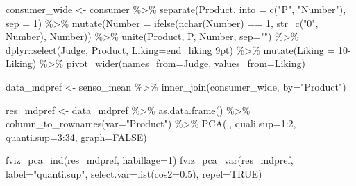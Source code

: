 \documentclass[
]{book}
\newenvironment{Shaded}{\begin{snugshade}}{\end{snugshade}}
\newcommand{\AttributeTok}[1]{\textcolor[rgb]{0.77,0.63,0.00}{#1}}
\newcommand{\ConstantTok}[1]{\textcolor[rgb]{0.00,0.00,0.00}{#1}}
\newcommand{\DecValTok}[1]{\textcolor[rgb]{0.00,0.00,0.81}{#1}}
\newcommand{\FloatTok}[1]{\textcolor[rgb]{0.00,0.00,0.81}{#1}}
\newcommand{\FunctionTok}[1]{\textcolor[rgb]{0.00,0.00,0.00}{#1}}
\newcommand{\NormalTok}[1]{#1}
\newcommand{\OtherTok}[1]{\textcolor[rgb]{0.56,0.35,0.01}{#1}}
\newcommand{\SpecialCharTok}[1]{\textcolor[rgb]{0.00,0.00,0.00}{#1}}
\newcommand{\StringTok}[1]{\textcolor[rgb]{0.31,0.60,0.02}{#1}}
\begin{document}
\begin{Shaded}
\begin{Highlighting}[]
\NormalTok{consumer\_wide }\OtherTok{\textless{}{-}}\NormalTok{ consumer }\SpecialCharTok{\%\textgreater{}\%} 
  \FunctionTok{separate}\NormalTok{(Product, }\AttributeTok{into =} \FunctionTok{c}\NormalTok{(}\StringTok{"P"}\NormalTok{, }\StringTok{"Number"}\NormalTok{), }\AttributeTok{sep =} \DecValTok{1}\NormalTok{) }\SpecialCharTok{\%\textgreater{}\%} 
  \FunctionTok{mutate}\NormalTok{(}\AttributeTok{Number =} \FunctionTok{ifelse}\NormalTok{(}\FunctionTok{nchar}\NormalTok{(Number) }\SpecialCharTok{==} \DecValTok{1}\NormalTok{, }\FunctionTok{str\_c}\NormalTok{(}\StringTok{"0"}\NormalTok{, Number), Number)) }\SpecialCharTok{\%\textgreater{}\%} 
  \FunctionTok{unite}\NormalTok{(Product, P, Number, }\AttributeTok{sep=}\StringTok{""}\NormalTok{) }\SpecialCharTok{\%\textgreater{}\%} 
\NormalTok{  dplyr}\SpecialCharTok{::}\FunctionTok{select}\NormalTok{(Judge, Product, }\AttributeTok{Liking=}\StringTok{\textasciigrave{}}\AttributeTok{end\_liking 9pt}\StringTok{\textasciigrave{}}\NormalTok{) }\SpecialCharTok{\%\textgreater{}\%} 
  \FunctionTok{mutate}\NormalTok{(}\AttributeTok{Liking =} \DecValTok{10}\SpecialCharTok{{-}}\NormalTok{Liking) }\SpecialCharTok{\%\textgreater{}\%} 
  \FunctionTok{pivot\_wider}\NormalTok{(}\AttributeTok{names\_from=}\NormalTok{Judge, }\AttributeTok{values\_from=}\NormalTok{Liking)}

\NormalTok{data\_mdpref }\OtherTok{\textless{}{-}}\NormalTok{ senso\_mean }\SpecialCharTok{\%\textgreater{}\%} 
  \FunctionTok{inner\_join}\NormalTok{(consumer\_wide, }\AttributeTok{by=}\StringTok{"Product"}\NormalTok{)}

\NormalTok{res\_mdpref }\OtherTok{\textless{}{-}}\NormalTok{ data\_mdpref }\SpecialCharTok{\%\textgreater{}\%} 
  \FunctionTok{as.data.frame}\NormalTok{() }\SpecialCharTok{\%\textgreater{}\%} 
  \FunctionTok{column\_to\_rownames}\NormalTok{(}\AttributeTok{var=}\StringTok{"Product"}\NormalTok{) }\SpecialCharTok{\%\textgreater{}\%} 
  \FunctionTok{PCA}\NormalTok{(., }\AttributeTok{quali.sup=}\DecValTok{1}\SpecialCharTok{:}\DecValTok{2}\NormalTok{, }\AttributeTok{quanti.sup=}\DecValTok{3}\SpecialCharTok{:}\DecValTok{34}\NormalTok{, }\AttributeTok{graph=}\ConstantTok{FALSE}\NormalTok{)}

\FunctionTok{fviz\_pca\_ind}\NormalTok{(res\_mdpref, }\AttributeTok{habillage=}\DecValTok{1}\NormalTok{)}
\FunctionTok{fviz\_pca\_var}\NormalTok{(res\_mdpref, }\AttributeTok{label=}\StringTok{"quanti.sup"}\NormalTok{, }\AttributeTok{select.var=}\FunctionTok{list}\NormalTok{(}\AttributeTok{cos2=}\FloatTok{0.5}\NormalTok{), }\AttributeTok{repel=}\ConstantTok{TRUE}\NormalTok{)}
\end{Highlighting}
\end{Shaded}
\end{document}
